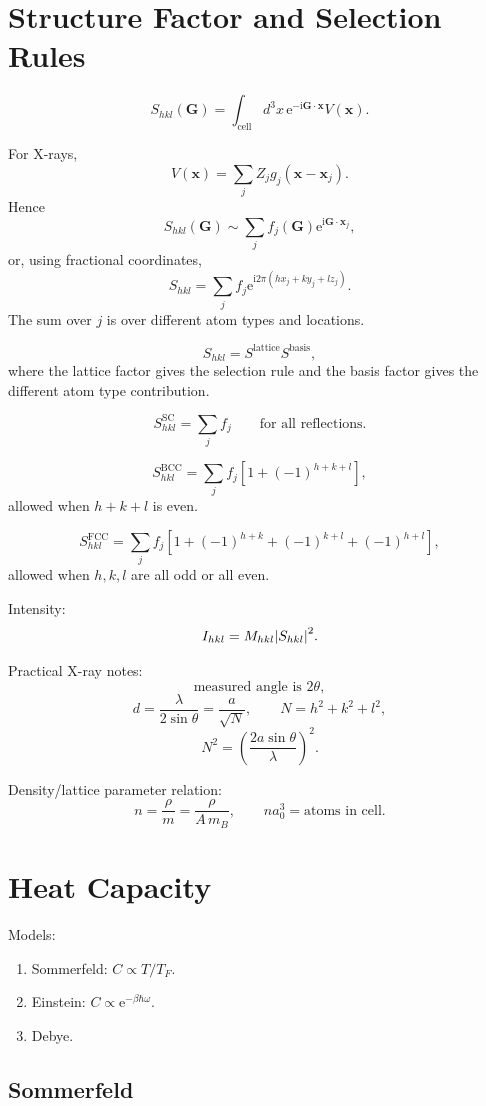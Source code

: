 \documentclass[11pt,a4paper]{article}
\newcommand{\ii}{\mathrm{i}}
\newcommand{\ee}{\mathrm{e}}
\newcommand{\vect}[1]{\boldsymbol{#1}}
\begin{document}
\section{Structure Factor and Selection Rules}

\[
  S_{hkl}(\vect G)=\int_{\text{cell}}d^3x\,
  \ee^{-\ii\vect G\cdot\vect x}V(\vect x).
\]

For X-rays,
\[
  V(\vect x)=\sum_j Z_j g_j(\vect x-\vect x_j).
\]
Hence
\[
  S_{hkl}(\vect G)
  \sim
  \sum_j f_j(\vect G)\ee^{\ii\vect G\cdot\vect x_j},
\]
or, using fractional coordinates,
\[
  S_{hkl}
  =
  \sum_j f_j
  \ee^{\ii2\pi(hx_j+ky_j+lz_j)}.
\]
The sum over $j$ is over different atom types and locations.

\[
  S_{hkl}=S^{\mathrm{lattice}}S^{\mathrm{basis}},
\]
where the lattice factor gives the selection rule and the basis factor gives
the different atom type contribution.

\[
  S_{hkl}^{\mathrm{SC}}=\sum_j f_j
  \qquad \text{for all reflections.}
\]

\[
  S_{hkl}^{\mathrm{BCC}}
  =
  \sum_j f_j\left[1+(-1)^{h+k+l}\right],
\]
allowed when $h+k+l$ is even.

\[
  S_{hkl}^{\mathrm{FCC}}
  =
  \sum_j f_j
  \left[
  1+(-1)^{h+k}+(-1)^{k+l}+(-1)^{h+l}
  \right],
\]
allowed when $h,k,l$ are all odd or all even.

Intensity:
\[
  I_{hkl}=M_{hkl}\abs{S_{hkl}}^2.
\]

Practical X-ray notes:
\[
  \text{measured angle is } 2\theta,
\]
\[
  d=\frac{\lambda}{2\sin\theta}
  =
  \frac{a}{\sqrt{N}},
  \qquad
  N=h^2+k^2+l^2,
\]
\[
  N^2=\left(\frac{2a\sin\theta}{\lambda}\right)^2.
\]

Density/lattice parameter relation:
\[
  n=\frac{\rho}{m}=\frac{\rho}{A\,m_B},
  \qquad
  n a_0^3 = \text{atoms in cell}.
\]

\section{Heat Capacity}

Models:
\begin{enumerate}
  \item Sommerfeld: $C\propto T/T_F$.
  \item Einstein: $C\propto \ee^{-\beta\hbar\omega}$.
  \item Debye.
\end{enumerate}

\subsection{Sommerfeld}
\end{document}
